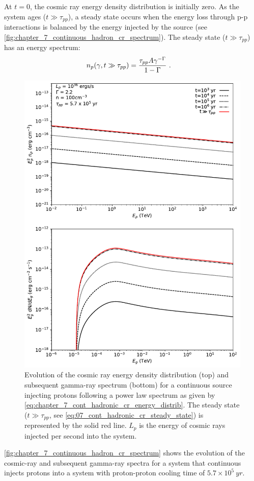 At $t=0$, the cosmic ray energy density distribution is initially zero. As the system ages ($t\gg\tau_{pp}$), a steady state occurs when the energy loss through p-p interactions is balanced by the energy injected by the source (see \autoref{fig:chapter_7_continuous_hadron_cr_spectrum}). The steady state ($t\gg \tau_{pp}$) has an energy spectrum:
\begin{equation}
    \begin{aligned}
    	n_p\qty(\gamma, t\gg \tau_{pp})&=\frac{\tau_{pp}A\gamma^{-\Gamma}}{1-\Gamma}\text{ .}
    \end{aligned} \label{eq:07_cont_hadronic_cr_steady_state}
\end{equation}
\begin{figure}[hbtp]
	\centering
	\includegraphics[width=1.0\textwidth]{07_Particle_Evolution/Images/evolution/continuous_proton_total_spectrum.pdf}
	\caption{Evolution of the cosmic ray energy density distribution (top) and subsequent gamma-ray spectrum (bottom) for a continuous source injecting protons following a power law spectrum as given by \autoref{eq:chapter_7_cont_hadronic_cr_energy_distrib}. The steady state ($t\gg \tau_{pp}$, see \autoref{eq:07_cont_hadronic_cr_steady_state}) is represented by the solid red line. $L_p$ is the energy of cosmic rays injected per second into the system.}
	\label{fig:chapter_7_continuous_hadron_cr_spectrum}
\end{figure}
\autoref{fig:chapter_7_continuous_hadron_cr_spectrum} shows the evolution of the cosmic-ray and subsequent gamma-ray spectra for a system that continuous injects protons into a system with proton-proton cooling time of $5.7\times 10^5~\si{yr}$.

